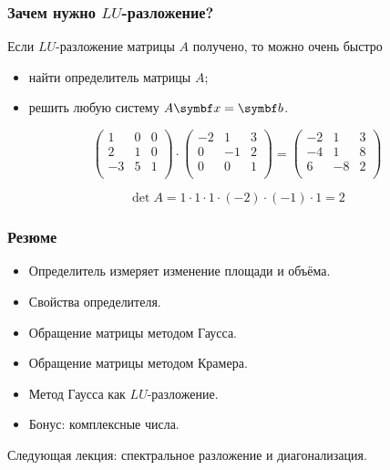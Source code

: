 \begin{frame}
    \frametitle{Зачем нужно $LU$-разложение?}

    Если $LU$-разложение матрицы $A$ получено, то можно очень быстро
    \begin{itemize}
        \item найти определитель матрицы $A$;
        \item решить любую систему $A\bx = \bb$.
    \end{itemize}

    \pause
    \[
    \begin{pmatrix}
        1 & 0 & 0 \\
        2 & 1 & 0 \\
        -3 & 5 & 1 \\
    \end{pmatrix} \cdot 
    \begin{pmatrix}
        -2 & 1 & 3 \\
        0 & -1 & 2 \\
        0 &  0 & 1 \\
    \end{pmatrix} = 
    \begin{pmatrix}
-2 & 1 & 3 \\
-4 & 1 & 8 \\
6 &  -8 & 2 \\        
    \end{pmatrix}
    \]

    \pause
    \[
    \det A = 1\cdot 1\cdot 1\cdot (-2) \cdot (-1) \cdot 1 = 2
    \]    

\end{frame}



\begin{frame}
    \frametitle{Резюме}

    \begin{itemize}[<+->]
    \item Определитель измеряет изменение площади и объёма.
    \item Свойства определителя.
    \item Обращение матрицы методом Гаусса.
    \item Обращение матрицы методом Крамера.
    \item Метод Гаусса как $LU$-разложение.
    \item Бонус: комплексные числа.
    \end{itemize}
    \pause
    \alert{Следующая лекция:} спектральное разложение и диагонализация.
        


\end{frame}